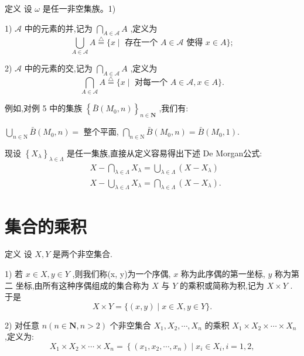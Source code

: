 定义 设 $\omega$ 是任一非空集族。1)

1) $\mathcal{A}$ 中的元素的并,记为 $\mathop{\bigcap }\limits_{{A \in  \mathcal{A}}}A$ ,定义为
$$\mathop{\bigcup }\limits_{{A \in  \mathcal{A}}}A\overset{\bigtriangleup }{ = }\{ x \mid  \text{ 存在一个 }A \in  \mathcal{A}\text{ 使得 }x \in  A\} ;$$

2) $\mathcal{A}$ 中的元素的交,记为 $\mathop{\bigcap }\limits_{{A \in  \mathcal{A}}}A$ ,定义为
$$\mathop{\bigcap }\limits_{{A \in  \mathcal{A}}}A\overset{ \bigtriangleup  }{ = }\{ x \mid  \text{ 对每一个 }A \in  \mathcal{A},x \in  A\} .$$

例如,对例 5 中的集族 ${\left\{  \bar{B}\left( {M}_{0},n\right) \right\}  }_{n \in  \mathbf{N}}$ ,我们有:

$\mathop{\bigcup }\limits_{{n \in  \mathrm{N}}}\bar{B}\left( {{M}_{0},n}\right)  =$ 整个平面, $\mathop{\bigcap }\limits_{{n \in  \mathrm{N}}}\bar{B}\left( {{M}_{0},n}\right)  = \bar{B}\left( {{M}_{0},1}\right) .$

现设 ${\left\{  {X}_{\lambda }\right\}  }_{\lambda  \in  \Lambda }$ 是任一集族,直接从定义容易得出下述 De Morgan公式:
\begin{align*}
	&X - \mathop{\bigcap }\limits_{{\lambda  \in  \Lambda }}{X}_{\lambda } = \mathop{\bigcup }\limits_{{\lambda  \in  \Lambda }}\left( {X - {X}_{\lambda }}\right)\\
	&X - \mathop{\bigcup }\limits_{{\lambda  \in  \Lambda }}{X}_{\lambda } = \mathop{\bigcap }\limits_{{\lambda  \in  \Lambda }}\left( {X - {X}_{\lambda }}\right) .
\end{align*}

\section*{集合的乘积}

定义 设 $X,Y$ 是两个非空集合.

1) 若 $x \in  X,y \in  Y$ ,则我们称(x, y)为一个序偶, $x$ 称为此序偶的第一坐标, $y$ 称为第二 坐标,由所有这种序偶组成的集合称为 $X$ 与 $Y$ 的乘积或简称为积,记为 $X \times  Y$ . 于是
$$X \times  Y = \{ \left( {x,y}\right)  \mid  x \in  X,y \in  Y\} .$$

2) 对任意 $n\left( {n \in  \mathbf{N},n > 2}\right)$ 个非空集合 ${X}_{1},{X}_{2},\cdots ,{X}_{n}$ 的乘积 ${X}_{1} \times  {X}_{2} \times  \cdots  \times  {X}_{n}$ ,定义为:
$${X}_{1} \times  {X}_{2} \times  \cdots  \times  {X}_{n} = \left\{  {\left( {{x}_{1},{x}_{2},\cdots ,{x}_{n}}\right)  \mid  {x}_{i} \in  {X}_{i},i = 1,2,}\right.$$

